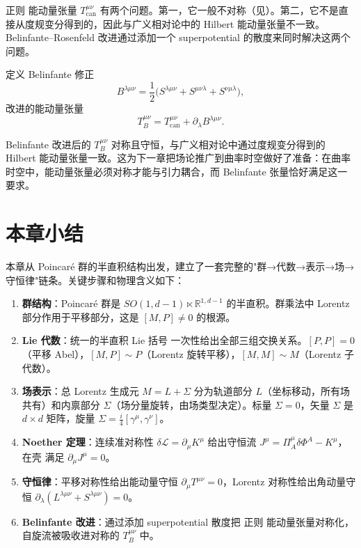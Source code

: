 正则 能动量张量 $T^{\mu\nu}_{\text{can}}$ 有两个问题。第一，它一般不对称（见）。第二，它不是直接从度规变分得到的，因此与广义相对论中的 Hilbert 能动量张量不一致。Belinfante--Rosenfeld 改进通过添加一个 superpotential 的散度来同时解决这两个问题。

定义 Belinfante 修正
\begin{equation}\label{eq:ms-poincare-B-def}
B^{\lambda\mu\nu}=\frac{1}{2}\big(S^{\lambda\mu\nu}+S^{\mu\nu\lambda}+S^{\nu\mu\lambda}\big),
\end{equation}
改进的能动量张量
\begin{equation}\label{eq:ms-poincare-TB-def}
\boxed{
T_B^{\mu\nu}=T_{\text{can}}^{\mu\nu}+\partial_\lambda B^{\lambda\mu\nu}.
}
\end{equation}

Belinfante 改进后的 $T_B^{\mu\nu}$ 对称且守恒，与广义相对论中通过度规变分得到的 Hilbert 能动量张量一致。这为下一章把场论推广到曲率时空做好了准备：在曲率时空中，能动量张量必须对称才能与引力耦合，而 Belinfante 张量恰好满足这一要求。

\section*{本章小结}

本章从 Poincaré 群的半直积结构出发，建立了一套完整的"群→代数→表示→场→守恒律"链条。关键步骤和物理含义如下：

\begin{enumerate}
\item \textbf{群结构}：Poincaré 群是 $SO(1,d-1)\ltimes\mathbb{R}^{1,d-1}$ 的半直积。群乘法中 Lorentz 部分作用于平移部分，这是 $[M,P]\neq 0$ 的根源。
\item \textbf{Lie 代数}：统一的半直积 Lie 括号 一次性给出全部三组交换关系。$[P,P]=0$（平移 Abel），$[M,P]\sim P$（Lorentz 旋转平移），$[M,M]\sim M$（Lorentz 子代数）。
\item \textbf{场表示}：总 Lorentz 生成元 $M=L+\Sigma$ 分为轨道部分 $L$（坐标移动，所有场共有）和内禀部分 $\Sigma$（场分量旋转，由场类型决定）。标量 $\Sigma=0$，矢量 $\Sigma$ 是 $d\times d$ 矩阵，旋量 $\Sigma=\frac{i}{4}[\gamma^\mu,\gamma^\nu]$。
\item \textbf{Noether 定理}：连续准对称性 $\delta\mathcal{L}=\partial_\mu K^\mu$ 给出守恒流 $J^\mu=\Pi_A^\mu\delta\Phi^A-K^\mu$，在壳 满足 $\partial_\mu J^\mu=0$。
\item \textbf{守恒律}：平移对称性给出能动量守恒 $\partial_\mu T^{\mu\nu}=0$，Lorentz 对称性给出角动量守恒 $\partial_\lambda(L^{\lambda\mu\nu}+S^{\lambda\mu\nu})=0$。
\item \textbf{Belinfante 改进}：通过添加 superpotential 散度把 正则 能动量张量对称化，自旋流被吸收进对称的 $T_B^{\mu\nu}$ 中。
\end{enumerate}

